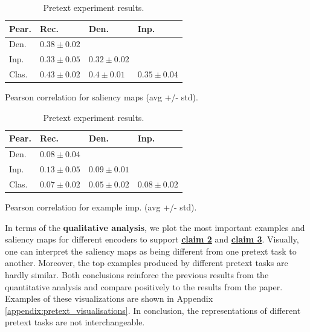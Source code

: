 \begin{table}[H]
\footnotesize
    \begin{subtable}[h]{0.5\linewidth}
        \centering
        \begin{tabular}{llll}
        \hline
                        Pear. & Rec. & Den. & Inp.   \\
        \hline
         
         Den.     & $0.38 \pm 0.02$  & &     \\
         Inp.   & $0.33 \pm 0.05$  & $0.32 \pm 0.02$ &    \\
         Clas.   & $0.43 \pm 0.02$  & $0.4 \pm 0.01$  & $0.35 \pm 0.04$     \\
        \hline
        \end{tabular}
    \caption{Pearson correlation for saliency maps (avg +/- std).}
    \label{table:pc_saliency_reproduced}
    \end{subtable}
    \begin{subtable}[h]{0.5\linewidth}
        \centering

        \begin{tabular}{llll}
        \hline
                        Pear. & Rec. & Den. & Inp.  \\
        \hline
         
         Den.    & $0.08 \pm 0.04$  &  &    \\
         Inp.   & $0.13 \pm 0.05$  & $0.09 \pm 0.01$ &   \\
         Clas.   & $0.07 \pm 0.02$  & $0.05 \pm 0.02$ & $0.08 \pm 0.02$   \\
        \hline
            \end{tabular}
        
    \caption{Pearson correlation for example imp. (avg +/- std).}
    \label{table:pc_example_reproduced}
    \end{subtable}
    \caption{Pretext experiment results.}
\end{table}

In terms of the \textbf{qualitative analysis}, we plot the most important examples and saliency maps for different encoders to support \textbf{\hyperref[claim2]{claim 2}} and \textbf{\hyperref[claim3]{claim 3}}. Visually, one can interpret the saliency maps as being different from one pretext task to another. Moreover, the top examples produced by different pretext tasks are hardly similar. Both conclusions reinforce the previous results from the quantitative analysis and compare positively to the results from the paper. Examples of these visualizations are shown in Appendix \ref{appendix:pretext_visualisations}. In conclusion, the representations of different pretext tasks are not interchangeable.



